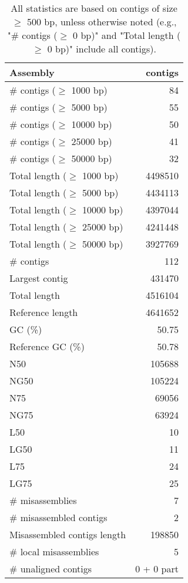 \documentclass[12pt,a4paper]{article}
\begin{document}
\begin{table}[ht]
\begin{center}
\caption{All statistics are based on contigs of size $\geq$ 500 bp, unless otherwise noted (e.g., "\# contigs ($\geq$ 0 bp)" and "Total length ($\geq$ 0 bp)" include all contigs).}
\begin{tabular}{|l*{1}{|r}|}
\hline
Assembly & contigs \\ \hline
\# contigs ($\geq$ 1000 bp) & 84 \\ \hline
\# contigs ($\geq$ 5000 bp) & 55 \\ \hline
\# contigs ($\geq$ 10000 bp) & 50 \\ \hline
\# contigs ($\geq$ 25000 bp) & 41 \\ \hline
\# contigs ($\geq$ 50000 bp) & 32 \\ \hline
Total length ($\geq$ 1000 bp) & 4498510 \\ \hline
Total length ($\geq$ 5000 bp) & 4434113 \\ \hline
Total length ($\geq$ 10000 bp) & 4397044 \\ \hline
Total length ($\geq$ 25000 bp) & 4241448 \\ \hline
Total length ($\geq$ 50000 bp) & 3927769 \\ \hline
\# contigs & 112 \\ \hline
Largest contig & 431470 \\ \hline
Total length & 4516104 \\ \hline
Reference length & 4641652 \\ \hline
GC (\%) & 50.75 \\ \hline
Reference GC (\%) & 50.78 \\ \hline
N50 & 105688 \\ \hline
NG50 & 105224 \\ \hline
N75 & 69056 \\ \hline
NG75 & 63924 \\ \hline
L50 & 10 \\ \hline
LG50 & 11 \\ \hline
L75 & 24 \\ \hline
LG75 & 25 \\ \hline
\# misassemblies & 7 \\ \hline
\# misassembled contigs & 2 \\ \hline
Misassembled contigs length & 198850 \\ \hline
\# local misassemblies & 5 \\ \hline
\# unaligned contigs & 0 + 0 part \\ \hline

\end{tabular}
\end{center}
\end{table}
\end{document}
